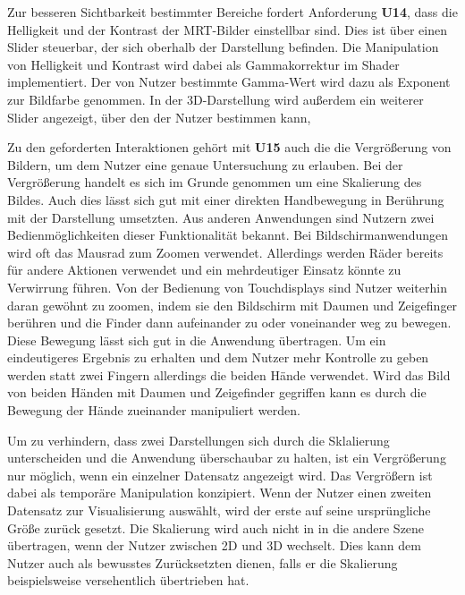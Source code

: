 Zur besseren Sichtbarkeit bestimmter Bereiche fordert Anforderung \textbf{U14}, dass die Helligkeit und der Kontrast der MRT-Bilder einstellbar sind. Dies ist über einen Slider steuerbar, der sich oberhalb der Darstellung befinden. 
Die Manipulation von Helligkeit und Kontrast wird dabei als Gammakorrektur im Shader implementiert. Der von Nutzer bestimmte Gamma-Wert wird dazu als Exponent zur Bildfarbe genommen. 
In der 3D-Darstellung wird außerdem ein weiterer Slider angezeigt, über den der Nutzer bestimmen kann, 

Zu den geforderten Interaktionen gehört mit \textbf{U15} auch die die Vergrößerung von Bildern, um dem Nutzer eine genaue Untersuchung zu erlauben. Bei der Vergrößerung handelt es sich im Grunde genommen um eine Skalierung des Bildes. Auch dies lässt sich gut mit einer direkten Handbewegung in Berührung mit der Darstellung umsetzten. Aus anderen Anwendungen sind Nutzern zwei Bedienmöglichkeiten dieser Funktionalität bekannt. Bei Bildschirmanwendungen wird oft das Mausrad zum Zoomen verwendet. Allerdings werden Räder bereits für andere Aktionen verwendet und ein mehrdeutiger Einsatz könnte zu Verwirrung führen. Von der Bedienung von Touchdisplays sind Nutzer weiterhin daran gewöhnt zu zoomen, indem sie den Bildschirm mit Daumen und Zeigefinger berühren und die Finder dann aufeinander zu oder voneinander weg zu bewegen. Diese Bewegung lässt sich gut in die Anwendung übertragen. Um ein eindeutigeres Ergebnis zu erhalten und dem Nutzer mehr Kontrolle zu geben werden statt zwei Fingern allerdings die beiden Hände verwendet. Wird das Bild von beiden Händen mit Daumen und Zeigefinder gegriffen kann es durch die Bewegung der Hände zueinander manipuliert werden.

Um zu verhindern, dass zwei Darstellungen sich durch die Sklalierung unterscheiden und die Anwendung überschaubar zu halten, ist ein Vergrößerung nur möglich, wenn ein einzelner Datensatz angezeigt wird. 
Das Vergrößern ist dabei als temporäre Manipulation konzipiert. Wenn der Nutzer einen zweiten Datensatz zur Visualisierung auswählt, wird der erste auf seine ursprüngliche Größe zurück gesetzt. Die Skalierung wird auch nicht in in die andere Szene übertragen, wenn der Nutzer zwischen 2D und 3D wechselt. Dies kann dem Nutzer auch als bewusstes Zurücksetzten dienen, falls er die Skalierung beispielsweise versehentlich übertrieben hat.


